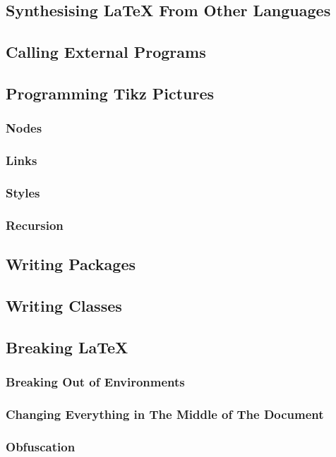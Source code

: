 \subsection{Synthesising \LaTeX{} From Other Languages}


\subsection{Calling External Programs}


\subsection{Programming Tikz Pictures}
\subsubsection{Nodes}
\subsubsection{Links}
\subsubsection{Styles}
\subsubsection{Recursion}


\subsection{Writing Packages}


\subsection{Writing Classes}


\subsection{Breaking \LaTeX}
\subsubsection{Breaking Out of Environments}
\subsubsection{Changing Everything in The Middle of The Document}
\subsubsection{Obfuscation}